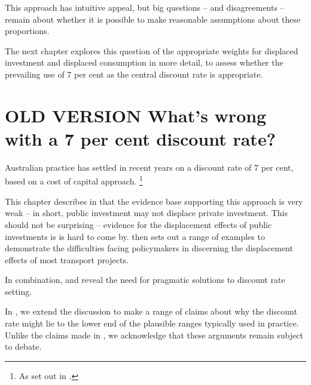 This approach has intuitive appeal, but big questions -- and disagreements -- remain about whether it is possible to make reasonable assumptions about these proportions. 

The next chapter explores this question of the appropriate weights for displaced investment and displaced consumption in more detail, to assess whether the prevailing use of 7 per cent as the central discount rate is appropriate.



















\chapter{OLD VERSION What's wrong with a 7 per cent discount rate?}\label{chap:what-is-wrong-with-seven-per-cent}

Australian practice has settled in recent years on a discount rate of 7 per cent, based on a cost of capital approach.%
    \footnote{As set out in .}

This chapter describes in  that the evidence base supporting this approach is very weak -- in short, public investment may not displace private investment. This should not be surprising -- evidence for the displacement effects of public investments is is hard to come by.  then sets out a range of examples to demonstrate the difficulties facing policymakers in discerning the displacement effects of most transport projects.

In combination,  and  reveal the need for pragmatic solutions to discount rate setting. 

In , we extend the discussion to make a range of claims about why the discount rate might lie to the lower end of the plausible ranges typically used in practice. Unlike the claims made in , we acknowledge that these arguments remain subject to debate. 



